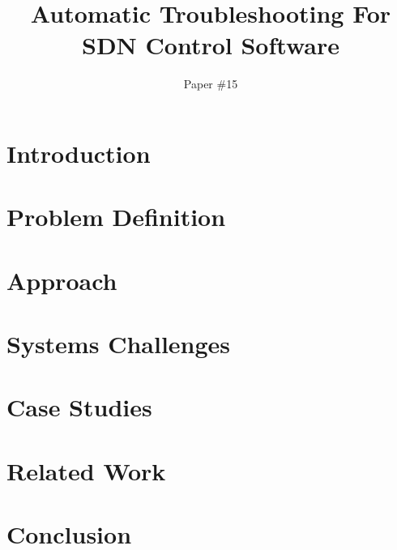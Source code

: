 \documentclass{sig-alt-hotnets}
\begin{document}
    \date{}

\title{Automatic Troubleshooting For SDN Control Software}

\author{Paper \#15}

\date{}
    \maketitle
    \thispagestyle{empty}

\abstract{{\it }}

\section{Introduction}
\label{sec:intro}


\section{Problem Definition}
\label{sec:formalism}


\section{Approach}
\label{sec:approach}


\section{Systems Challenges}
\label{sec:systems_challenges}


\section{Case Studies}
\label{sec:casestudies}


\section{Related Work}
\label{sec:relatedwork}


\section{Conclusion}
\label{sec:conclusion}


\newpage
 

%
\end{document}
